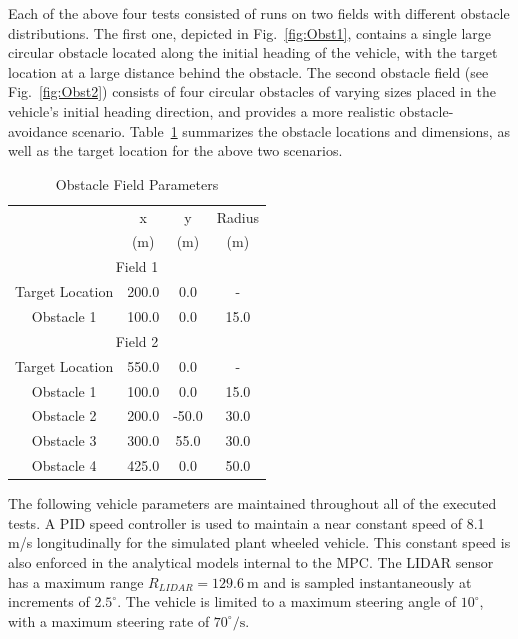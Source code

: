 \documentclass[12pt,twocolumn]{article}
\newcommand{\CHRONO}{{\sffamily{{Chrono}}}}
\begin{document}
Each of the above four tests consisted of runs on two fields with different obstacle distributions. 
The first one, depicted in Fig.~\ref{fig:Obst1}, contains a single large circular obstacle located along the initial heading of the vehicle, with the target location at a large distance behind the obstacle. 
The second obstacle field (see Fig.~\ref{fig:Obst2}) consists of four circular obstacles of varying sizes placed in the vehicle's initial heading direction, and provides a more realistic obstacle-avoidance scenario.
Table~\ref{t:ObstSummary} summarizes the obstacle locations and dimensions, as well as the target location for the above two scenarios.

\begin{table}
	\begin{center}
		\begin{tabular}{||c|c|c|c||} 
			
			\hline
			& x & y & Radius\\
			& (m) & (m) & (m)\\
			\hline\hline
			\multicolumn{4}{||c||}{Field 1} \\
			\hline
			Target Location  & 200.0 & 0.0 & -\\ 
			\hline
			Obstacle 1 & 100.0 & 0.0 & 15.0\\			
			\hline\hline
			\multicolumn{4}{||c||}{Field 2} \\
			\hline
			Target Location  & 550.0 & 0.0 & -\\ 
			\hline
			Obstacle 1 & 100.0 & 0.0 & 15.0\\
			\hline
			Obstacle 2 & 200.0 & -50.0 & 30.0\\
			\hline
			Obstacle 3 & 300.0 & 55.0 & 30.0\\
			\hline
			Obstacle 4 & 425.0 & 0.0 & 50.0\\
			\hline
		\end{tabular}
	\end{center}
	\caption{Obstacle Field Parameters}
	\label{t:ObstSummary}
\end{table}

The following vehicle parameters are maintained throughout all of the executed tests. A PID speed controller is used to maintain a near constant speed of 8.1 m/s longitudinally for the simulated plant {\CHRONO} wheeled vehicle. This constant speed is also enforced in the analytical models internal to the MPC. The LIDAR sensor has a maximum range $R_{LIDAR} = 129.6~\text{m}$ and is sampled instantaneously at increments of $2.5^\circ$. The vehicle is limited to a maximum steering angle of $10^\circ$, with a maximum steering rate of $70^{\circ}/\text{s}$. 
\end{document}
